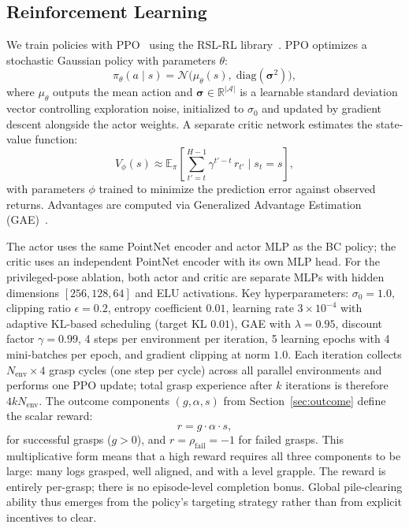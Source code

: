 \documentclass[conference]{IEEEtran}
\begin{document}
\subsection{Reinforcement Learning}
\label{sec:rl}
We train policies with PPO~\cite{schulman2017ppo} using the RSL-RL library~\cite{rudin2022learning}.
PPO optimizes a stochastic Gaussian policy with parameters $\theta$:
\begin{equation}
    \pi_\theta(a \mid s) = \mathcal{N}\!\big(\mu_\theta(s),\;\mathrm{diag}(\bm{\sigma}^2)\big),
\end{equation}
where $\mu_\theta$ outputs the mean action and $\bm{\sigma} \in \mathbb{R}^{|\mathcal{A}|}$ is a learnable standard deviation vector controlling exploration noise, initialized to $\sigma_0$ and updated by gradient descent alongside the actor weights.
A separate critic network estimates the state-value function:
\begin{equation}
    V_\phi(s) \approx \mathbb{E}_\pi\!\left[\sum_{t'=t}^{H-1} \gamma^{t'-t}\, r_{t'} \;\Big|\; s_t = s\right],
\end{equation}
with parameters $\phi$ trained to minimize the prediction error against observed returns.
Advantages are computed via Generalized Advantage Estimation (GAE)~\cite{schulman2017ppo}.

The actor uses the same PointNet encoder and actor MLP as the BC policy; the critic uses an independent PointNet encoder with its own MLP head.
For the privileged-pose ablation, both actor and critic are separate MLPs with hidden dimensions $[256, 128, 64]$ and ELU activations.
Key hyperparameters: $\sigma_0 = 1.0$, clipping ratio $\epsilon=0.2$, entropy coefficient $0.01$, learning rate $3\times10^{-4}$ with adaptive KL-based scheduling (target KL $0.01$), GAE with $\lambda=0.95$, discount factor $\gamma = 0.99$, 4 steps per environment per iteration, 5 learning epochs with 4 mini-batches per epoch, and gradient clipping at norm $1.0$.
Each iteration collects $N_{\text{env}} \times 4$ grasp cycles (one step per cycle) across all parallel environments and performs one PPO update; total grasp experience after $k$ iterations is therefore $4 k N_{\text{env}}$.
The outcome components $(g,\alpha,s)$ from Section~\ref{sec:outcome} define the scalar reward:
\label{sec:reward}
\begin{equation}
r = g \cdot \alpha \cdot s,
\end{equation}
for successful grasps ($g > 0$), and $r = \rho_{\text{fail}} = -1$ for failed grasps.
This multiplicative form means that a high reward requires all three components to be large: many logs grasped, well aligned, and with a level grapple.
The reward is entirely per-grasp; there is no episode-level completion bonus.
Global pile-clearing ability thus emerges from the policy's targeting strategy rather than from explicit incentives to clear.
\end{document}

